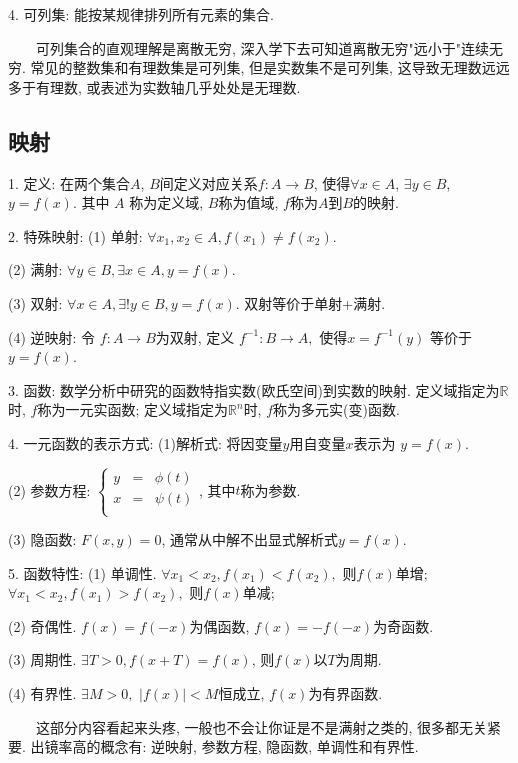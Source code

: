   
4. 可列集: 能按某规律排列所有元素的集合. 

\begin{tcolorbox}[colback=gray!5,colframe=orange!75!black,title=注意事项]
    ~~~~可列集合的直观理解是离散无穷, 深入学下去可知道离散无穷"远小于"连续无穷. 常见的整数集和有理数集是可列集, 
    但是实数集不是可列集, 这导致无理数远远多于有理数, 或表述为实数轴几乎处处是无理数.
\end{tcolorbox}

\subsection{映射}

1. 定义: 在两个集合$A$, $B$间定义对应关系$f: A\rightarrow B$, 使得$\forall x \in A$, $\exists y \in B$, $y=f(x)$. 其中
$A$ 称为定义域, $B$称为值域, $f$称为$A$到$B$的映射.

2. 特殊映射: (1) 单射: $\forall x_1,x_2 \in A , f(x_1)\neq f(x_2)$.

(2) 满射: $\forall y \in B, \exists x \in A, y=f(x)$.

(3) 双射: $\forall x \in A ,\exists !y \in B, y=f(x)$. 双射等价于单射+满射.

(4) 逆映射: 令 $f:A\rightarrow B$为双射, 定义 $f^{-1}:B \rightarrow A,$  使得$x=f^{-1}(y)$ 等价于$y=f(x)$.

3. 函数: 数学分析中研究的函数特指实数(欧氏空间)到实数的映射. 定义域指定为$\mathbb{R}$时, $f$称为一元实函数; 定义域指定为$\mathbb{R}^n$时, 
$f$称为多元实(变)函数.

4. 一元函数的表示方式: (1)解析式: 将因变量$y$用自变量$x$表示为 $y=f(x)$.

(2) 参数方程: $\left\{\begin{aligned}
    y&=&\phi(t)\\
    x&=&\psi(t)\\
\end{aligned}\right.$, 其中$t$称为参数.

(3) 隐函数: $F(x,y)=0$, 通常从中解不出显式解析式$y=f(x)$.

5. 函数特性: (1) 单调性. $\forall x_1<x_2, f(x_1)<f(x_2),$ 则$f(x)$单增; $\forall x_1<x_2, f(x_1)>f(x_2),$ 则$f(x)$单减;

(2) 奇偶性. $f(x)=f(-x)$为偶函数, $f(x)=-f(-x)$为奇函数.

(3) 周期性. $\exists T>0, f(x+T)=f(x)$, 则$f(x)$以$T$为周期.

(4) 有界性. $\exists M>0,$ $|f(x)|<M$恒成立, $f(x)$为有界函数.

\begin{tcolorbox}[colback=gray!5,colframe=orange!75!black,title=注意事项]
    ~~~~这部分内容看起来头疼, 一般也不会让你证是不是满射之类的, 很多都无关紧要. 出镜率高的概念有: 逆映射, 参数方程, 隐函数, 单调性和有界性.
\end{tcolorbox}

